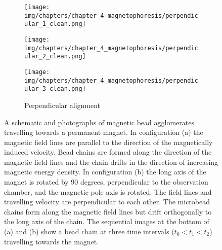 \begin{figure}[htb]
\begin{subfigure}[b]{0.48\textwidth}
\begin{minipage}[t]{0.32\textwidth}
			\texttt{[image: img/chapters/chapter\_4\_magnetophoresis/perpendicular\_1\_clean.png]}
			\end{minipage}
			\begin{minipage}[t]{0.32\textwidth}
			\texttt{[image: img/chapters/chapter\_4\_magnetophoresis/perpendicular\_2\_clean.png]}
			\end{minipage}
			\begin{minipage}[t]{0.32\textwidth}
			\texttt{[image: img/chapters/chapter\_4\_magnetophoresis/perpendicular\_3\_clean.png]}
			\end{minipage}			
			\caption{Perpendicular alignment}
			\label{fig:perpendicularAlignment_photos}	
		\end{subfigure} 
        \caption[Schematic of magnetic bead agglomerates travelling towards a permanent magnet]{A schematic and photographs of magnetic bead agglomerates travelling towards a permanent magnet. In configuration (a) the magnetic field lines are parallel to the direction of the magnetically induced velocity. Bead chains are formed along the direction of the magnetic field lines and the chain drifts in the direction of increasing magnetic energy density. In configuration (b) the long axis of the magnet is rotated by 90 degrees, perpendicular to the observation chamber, and the magnetic pole axis is rotated. The field lines and travelling velocity are perpendicular to each other. The microbead chains form along the magnetic field lines but drift orthogonally to the long axis of the chain. The sequential images at the bottom of (a) and (b) show a bead chain at three time intervals ($t_{0}<t_{1}<t_{2}$) travelling towards the magnet.}
        \label{fig:particleAgglomeratesTravellingTowardsMagnet}
\end{figure}

